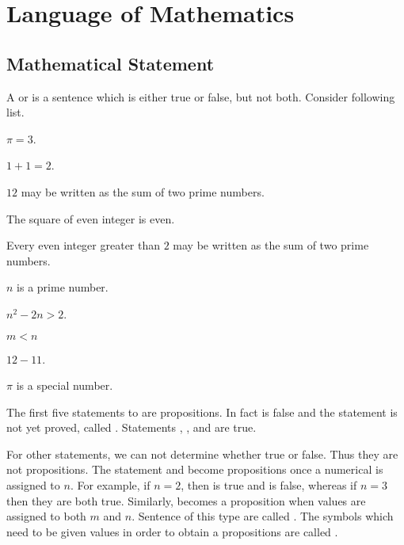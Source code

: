 
\chapter{Language of Mathematics}\label{chap:language}


\section{Mathematical Statement}


A  or  is a sentence which is either true or false, but not both.
Consider following list.
\begin{myEnum}
\item $\pi = 3$.
\item $1+1=2$.
\item $12$ may be written as the sum of two prime numbers.
\item The square of even integer is even.
\item Every even integer greater than $2$ may be written as the sum of two prime numbers.
\item $n$ is a prime number.
\item $n^2-2n>2$.
\item $m<n$
\item $12-11$.
\item $\pi$ is a special number.
\end{myEnum}

The first five statements  to  are propositions.
In fact  is false and 
the statement  is not yet proved, called .
Statements , , and  are true.

For other statements, we can not determine whether true or false.
Thus they are not propositions.
The statement  and  become propositions once a numerical  is assigned to $n$.
For example, if $n=2$, then  is true and  is false,
whereas if $n=3$ then they are both true.
Similarly,   becomes a proposition when values are assigned to both $m$ and $n$.
Sentence of this type are called .
The symbols which need to be given values in order to obtain a propositions are called .

